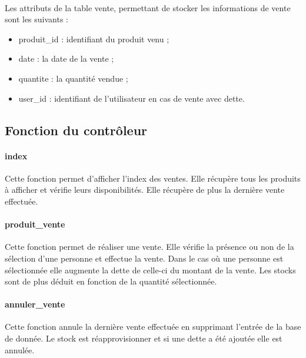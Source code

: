 \documentclass[twoside,UTF8]{EPURapport}
\begin{document}
            \paragraph{}Les attributs de la table vente, permettant de stocker les informations de vente sont les suivants :\\
            \begin{itemize}
                \item produit\_id : identifiant du produit venu ;\\
                \item date : la date de la vente ;\\
                \item quantite : la quantité vendue ;\\
                \item user\_id : identifiant de l'utilisateur en cas de vente avec dette.
            \end{itemize}

        \subsection{Fonction du contrôleur}

            \paragraph{index}Cette fonction permet d'afficher l'index des ventes. Elle récupère tous les produits à afficher et vérifie leurs disponibilités. Elle récupère de plus la dernière vente effectuée.

            \paragraph{produit\_vente}Cette fonction permet de réaliser une vente. Elle vérifie la présence ou non de la sélection d'une personne et effectue la vente. Dans le cas où une personne est sélectionnée elle augmente la dette de celle-ci du montant de la vente. Les stocks sont de plus déduit en fonction de la quantité sélectionnée.
            \paragraph{annuler\_vente}Cette fonction annule la dernière vente effectuée en supprimant l'entrée de la base de donnée. Le stock est réapprovisionner et si une dette a été ajoutée elle est annulée.
\end{document}
